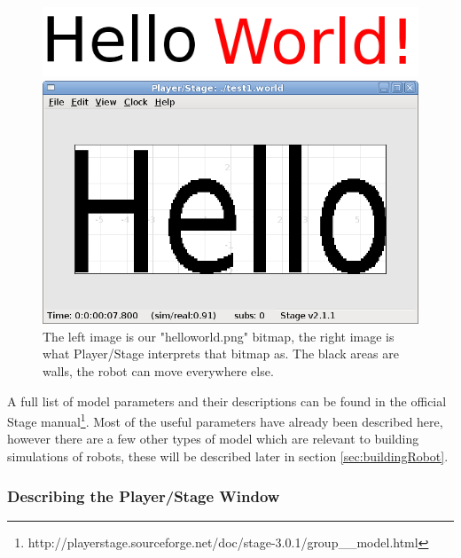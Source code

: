 \documentclass[a4paper]{article}
\newcommand{\plst}{Player/Stage\xspace}
\begin{document}
\begin{figure}
	\centering
	\begin{minipage}[c]{0.4\linewidth}
		\centering
		\includegraphics[width=\linewidth]{./pics/emptyWorld/writing.png}
		
	\end{minipage}%
	\hspace{0.05\linewidth}
	\begin{minipage}[c]{0.5\linewidth}
		\centering
		\includegraphics[width=\linewidth]{./pics/emptyWorld/bitmapHello.png} 
	\end{minipage}	
	\caption{The left image is our "helloworld.png" bitmap, the right image is what \plst interprets that bitmap as. The black areas are walls, the robot can move everywhere else.}
		\label{fig:helloWorldBitmap}
\end{figure}

A full list of model parameters and their descriptions can be found in the official Stage manual\footnote{http://playerstage.sourceforge.net/doc/stage-3.0.1/group\_\_model.html}. Most of the useful parameters have already been described here, however there are a few other types of model which are relevant to building simulations of robots, these will be described later in section \ref{sec:buildingRobot}.


\subsubsection{Describing the \plst Window}
\end{document}

